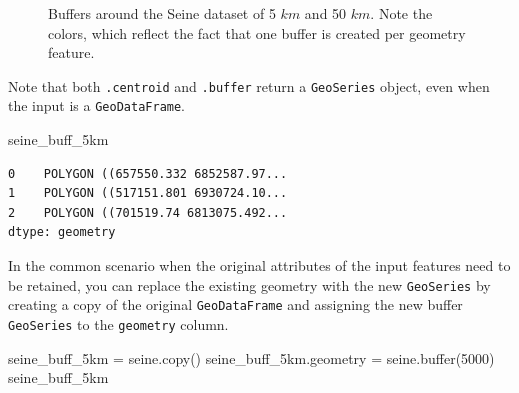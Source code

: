 \documentclass[
  letterpaper,
]{krantz}
\newenvironment{Shaded}{\begin{snugshade}}{\end{snugshade}}
\newcommand{\BuiltInTok}[1]{\textcolor[rgb]{0.00,0.23,0.31}{#1}}
\newcommand{\DecValTok}[1]{\textcolor[rgb]{0.68,0.00,0.00}{#1}}
\newcommand{\NormalTok}[1]{\textcolor[rgb]{0.00,0.23,0.31}{#1}}
\newcommand{\OperatorTok}[1]{\textcolor[rgb]{0.37,0.37,0.37}{#1}}
\begin{document}
\begin{figure}

\begin{minipage}{0.50\linewidth}



\end{minipage}%
%
\begin{minipage}{0.50\linewidth}



\end{minipage}%

\caption{\label{fig-buffers}Buffers around the Seine dataset of 5 \(km\)
and 50 \(km\). Note the colors, which reflect the fact that one buffer
is created per geometry feature.}

\end{figure}%

Note that both \texttt{.centroid} and \texttt{.buffer} return a
\texttt{GeoSeries} object, even when the input is a
\texttt{GeoDataFrame}.

\begin{Shaded}
\begin{Highlighting}[]
\NormalTok{seine\_buff\_5km}
\end{Highlighting}
\end{Shaded}

\begin{verbatim}
0    POLYGON ((657550.332 6852587.97...
1    POLYGON ((517151.801 6930724.10...
2    POLYGON ((701519.74 6813075.492...
dtype: geometry
\end{verbatim}

In the common scenario when the original attributes of the input
features need to be retained, you can replace the existing geometry with
the new \texttt{GeoSeries} by creating a copy of the original
\texttt{GeoDataFrame} and assigning the new buffer \texttt{GeoSeries} to
the \texttt{geometry} column.

\begin{Shaded}
\begin{Highlighting}[]
\NormalTok{seine\_buff\_5km }\OperatorTok{=}\NormalTok{ seine.copy()}
\NormalTok{seine\_buff\_5km.geometry }\OperatorTok{=}\NormalTok{ seine.}\BuiltInTok{buffer}\NormalTok{(}\DecValTok{5000}\NormalTok{)}
\NormalTok{seine\_buff\_5km}
\end{Highlighting}
\end{Shaded}
\end{document}
